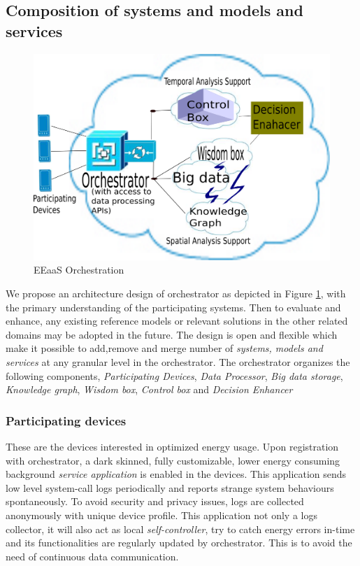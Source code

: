 \subsection{Composition of systems and models and services}
\begin{figure}[h]
 \begin{center}
 \includegraphics[scale=0.30]{Figures/EEaaOSArchEnhanced.png}
 \end{center}
 \caption{EEaaS Orchestration}
 \label{fig:Orch}
\end{figure}

We propose an architecture design of orchestrator as depicted in Figure \ref{fig:Orch}, with the primary understanding of the participating systems. Then to evaluate and enhance, any existing reference models or relevant solutions in the other related domains may be adopted in the future. The design is open and flexible which make it possible to add,remove and merge number of \textit{systems, models and services} at any granular level in the orchestrator. The orchestrator organizes the following components, \emph{Participating Devices}, \emph{Data Processor}, \emph{Big data storage}, \emph{Knowledge graph}, \emph{Wisdom box}, \emph{Control box} and  \emph{Decision Enhancer} %
\subsubsection{Participating devices}
\label{subsection:partdevice}
These are the devices interested in optimized energy usage. Upon registration with orchestrator, a dark skinned, fully customizable, lower energy consuming background \textit{service application} is enabled in the devices. This application sends low level system-call logs periodically and reports strange system behaviours spontaneously. To avoid security and privacy issues, logs are collected anonymously with unique device profile. This application not only a logs collector, it will also act as local \textit{self-controller}, try to catch energy errors in-time and its functionalities are regularly updated by orchestrator. This is to avoid the need of continuous data communication. 
